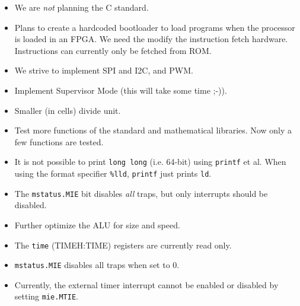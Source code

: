 \documentclass[12pt]{article}
\begin{document}
\begin{itemize}
\item We are \emph{not} planning the C standard.
\item Plans to create a hardcoded bootloader to load programs when the processor is loaded in an FPGA. We need the modify the instruction fetch hardware. Instructions can currently only be fetched from ROM.
\item We strive to implement SPI and I2C, and PWM.
\item Implement Supervisor Mode (this will take some time ;-)).
\item Smaller (in cells) divide unit.
\item Test more functions of the standard and mathematical libraries. Now only a few functions are tested.
\item It is not possible to print \texttt{long long} (i.e. 64-bit) using \texttt{printf} et al. When using the format specifier \texttt{\%lld}, \texttt{printf} just prints \texttt{ld}.
\item The \texttt{mstatus.MIE} bit disables \emph{all} traps, but only interrupts should be disabled.
\item Further optimize the ALU for size and speed.
\item The \texttt{time} (TIMEH:TIME) registers are currently read only.
\item \lstinline|mstatus.MIE| disables all traps when set to 0.
\item Currently, the external timer interrupt cannot be enabled or disabled by setting \texttt{mie.MTIE}. 
\end{itemize}

\end{document}
